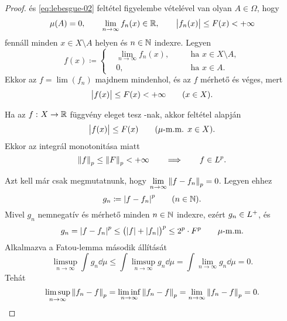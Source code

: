 \documentclass[
]{elteikthesis}[2024/04/26]
\begin{document}
	\begin{proof}
		 és \ref{eq:lebesgue-02} feltétel figyelembe vételével
		van olyan \( A \in \Omega \), hogy
		\[
			\mu(A) = 0, \qquad
			\lim_{n \to \infty} f_n(x) \in \mathbb{R}, \qquad
			\abs\big{ f_n(x) } \leq F(x) < +\infty
		\]
		fennáll minden \( x \in X \setminus A \) helyen és \( n \in \mathbb{N} \) indexre. 
		Legyen
		\[
			f(x) \coloneq 
			\left\{
			\begin{alignedat}{2}
				&\lim_{n \to \infty} f_n(x), \quad && \text{ha } x \in X \setminus A, \\[3pt]
				&0,                          \quad && \text{ha } x \in A.
			\end{alignedat}
			\right.
		\]
		Ekkor az \( f = \lim(f_n) \) majdnem mindenhol, és az \( f \) mérhető és véges, mert
		\[
			\abs\big{f(x)} \leq F(x) < +\infty \qquad (x \in X).
		\]
		
		Ha az \( f \,\colon X \to \mathbb{R} \) függvény eleget tesz -nak,
		akkor  feltétel alapján
		\[
			\abs\big{f(x)} \leq F(x) \qquad (\mu \text{-m.m. } x \in X).
		\]
		Ekkor az integrál monotonitása miatt
		\[
			\norm{f}_p \leq \norm{F}_p < +\infty
			\qquad \Longrightarrow \qquad
			f \in \Lebesgue[p].
		\]
		
		Azt kell már csak megmutatnunk, 
		hogy \( \lim\limits_{n \to \infty} \norm{f - f_n}_p = 0\). Legyen ehhez
		\[
			g_n \coloneq \abs{f - f_n}^p \qquad (n \in \mathbb{N}).
		\]
		Mivel \( g_n \) nemnegatív és mérhető minden \( n \in \mathbb{N} \) indexre, 
		ezért \( g_n \in L^+ \), és
		\[
			g_n = 
			\abs{f - f_n}^p \leq
			\bigl( \abs{f} + \abs{f_n} \bigr)^p \leq
			2^p \cdot F^p
			\qquad \mu \text{-m.m.}
		\]
		\newpage
		Alkalmazva a Fatou-lemma második állítását
		\[
			\limsup_{n \to \infty} \int g_n \dd{\mu} \leq
			\int \limsup_{n \to \infty} g_n \dd{\mu} =
			\int \lim_{n \to \infty} g_n \dd{\mu} = 0.
		\]
		Tehát
		\[
			\limsup_{n \to \infty} \norm{f_n - f}_p = 
			\liminf_{n \to \infty} \norm{f_n - f}_p = 
			\lim_{n \to \infty} \norm{f_n - f}_p = 0.
		\]
	\end{proof}
	
\end{document}
